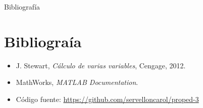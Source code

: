 \documentclass{beamer}
\begin{document}
\begin{frame}{Bibliografía}
\section{Bibliograía}
\begin{itemize}
\item J. Stewart, \emph{Cálculo de varias variables}, Cengage, 2012.
\item MathWorks, \emph{MATLAB Documentation}.
\item Código fuente: \url{https://github.com/servelloncarol/proped-3}
\end{itemize}
\end{frame}
\end{document}
